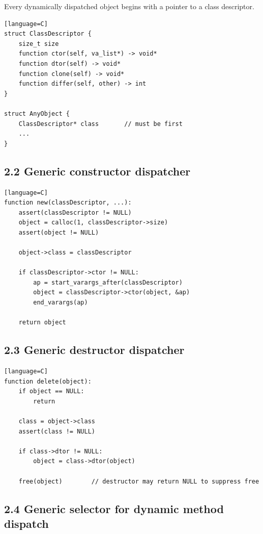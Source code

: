 \documentclass[11pt]{article}
\begin{document}
Every dynamically dispatched object begins with a pointer to a class
descriptor.

\begin{verbatim}[language=C]
struct ClassDescriptor {
    size_t size
    function ctor(self, va_list*) -> void*
    function dtor(self) -> void*
    function clone(self) -> void*
    function differ(self, other) -> int
}

struct AnyObject {
    ClassDescriptor* class       // must be first
    ...
}
\end{verbatim}

\subsection{2.2 Generic constructor
dispatcher}\label{generic-constructor-dispatcher}

\begin{verbatim}[language=C]
function new(classDescriptor, ...):
    assert(classDescriptor != NULL)
    object = calloc(1, classDescriptor->size)
    assert(object != NULL)

    object->class = classDescriptor

    if classDescriptor->ctor != NULL:
        ap = start_varargs_after(classDescriptor)
        object = classDescriptor->ctor(object, &ap)
        end_varargs(ap)

    return object
\end{verbatim}

\subsection{2.3 Generic destructor
dispatcher}\label{generic-destructor-dispatcher}

\begin{verbatim}[language=C]
function delete(object):
    if object == NULL:
        return

    class = object->class
    assert(class != NULL)

    if class->dtor != NULL:
        object = class->dtor(object)

    free(object)        // destructor may return NULL to suppress free
\end{verbatim}

\subsection{2.4 Generic selector for dynamic method
dispatch}\label{generic-selector-for-dynamic-method-dispatch}
\end{document}
